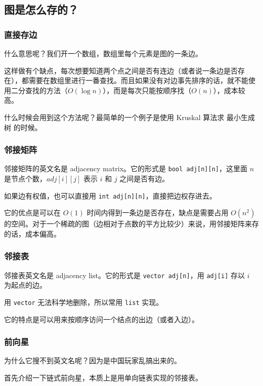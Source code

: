
\subsection{图是怎么存的？}

\subsubsection{直接存边}

什么意思呢？我们开一个数组，数组里每个元素是图的一条边。

这样做有个缺点，每次想要知道两个点之间是否有连边（或者说一条边是否存在），都需要在数组里进行一番查找。而且如果没有对边事先排序的话，就不能使用二分查找的方法（$O(\log n)$），而是每次只能按顺序找（$O(n)$），成本较高。

什么时候会用到这个方法呢？最简单的一个例子是使用 Kruskal 算法求  最小生成树  的时候。

\subsubsection{邻接矩阵}

邻接矩阵的英文名是 adjacency matrix。它的形式是 \texttt{bool adj[n][n]}，这里面 $n$ 是节点个数，$adj[i][j]$ 表示 $i$ 和 $j$ 之间是否有边。

如果边有权值，也可以直接用 \texttt{int adj[n][n]}，直接把边权存进去。

它的优点是可以在 $O(1)$ 时间内得到一条边是否存在，缺点是需要占用 $O(n^2)$ 的空间。对于一个稀疏的图（边相对于点数的平方比较少）来说，用邻接矩阵来存的话，成本偏高。

\subsubsection{邻接表}

邻接表英文名是 adjacency list。它的形式是 \texttt{vector adj[n]}，用 \texttt{adj[i]} 存以 $i$ 为起点的边。

用 \texttt{vector} 无法科学地删除，所以常用 \texttt{list} 实现。

它的特点是可以用来按顺序访问一个结点的出边（或者入边）。

\subsubsection{前向星}

为什么它搜不到英文名呢？因为是中国玩家乱搞出来的。

首先介绍一下链式前向星，本质上是用单向链表实现的邻接表。

